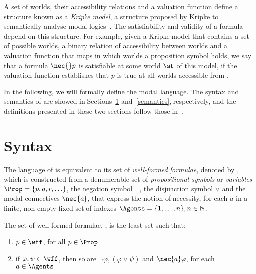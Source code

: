 A set of worlds, their accessibility relations and a valuation function define a
structure known as a \emph{Kripke model}, a structure proposed by Kripke to
semantically analyse modal logics~\cite{kripke:i}.  The satisfiability and
validity of a formula depend on this structure. For example, given a Kripke
model that contains a set of possible worlds, a binary relation of accessibility
between worlds and a valuation function that maps in which worlds a proposition
symbol holds, we say that a formula $\nec{}p$ is satisfiable at some world $\st$
of this model, if the valuation function establishes that $p$ is true at all
worlds accessible from \st.

In the following, we will formally define the modal language. The
syntax and semantics of  are showed in Sections~\ref{syntax}
and~\ref{semantics}, respectively, and the definitions presented in these two
sections follow those in~\cite{journals/jal/NalonD07}.

\section{Syntax}
\label{syntax}

The language of  is equivalent to its set of \emph{well-formed
formulae}, denoted by \wff, which is constructed from a denumerable set of
\emph{propositional symbols} or \emph{variables} $\Prop = \{p, q, r, \ldots\}$,
the negation symbol $\neg$, the disjunction symbol $\lor$ and the modal
connectives $\nec{a}$, that express the notion of necessity, for each $a$
in a finite, non-empty fixed set of indexes $\Agents = \{1, \ldots, n\}, n \in
\mathbb{N}$.

\begin{definition}
\label{def:wff}
    The set of well-formed formulae, \wff, is the least set such that:
    \begin{enumerate}
        \item $p \in \wff$, for all $p \in \Prop$
            \vspace{.2ex}
        \item if $\varphi, \psi \in \wff$, then so are $\neg \varphi, (\varphi
            \lor \psi)$ and $\nec{a} \varphi$, for each $a \in \Agents$
    \end{enumerate}
\end{definition}

